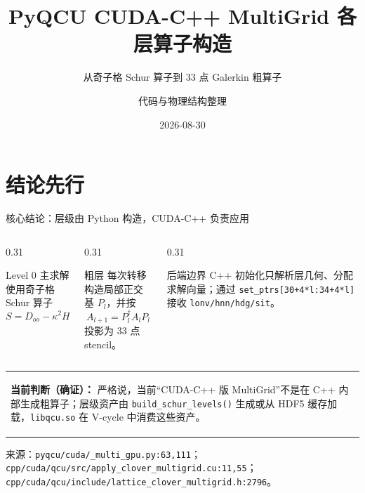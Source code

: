 \documentclass[UTF8,aspectratio=169,11pt]{ctexbeamer}
\title[PyQCU CUDA-C++ MG]{PyQCU CUDA-C++ MultiGrid 各层算子构造}
\subtitle{从奇子格 Schur 算子到 33 点 Galerkin 粗算子}
\author[代码与物理结构整理]{代码与物理结构整理}
\institute{PyQCU · Lattice QCD}
\date{2026-08-30}
\newcommand{\source}[1]{%
  \vspace{-0.08em}\par{\raggedright\scriptsize\color{muted}来源：#1\par}}
\newcommand{\src}[1]{\nolinkurl{#1}}
\newcommand{\verified}{\textcolor{evidence}{确证}}
\begin{document}
\begin{frame}[plain]
  \titlepage
\end{frame}

\section{结论先行}

\begin{frame}[t]{核心结论：层级由 Python 构造，CUDA-C++ 负责应用}
  \begin{columns}[T,totalwidth=\textwidth]
    \begin{column}{0.31\textwidth}
      \begin{block}{Level 0}
        \small
        主求解使用奇子格 Schur 算子
        \[
        S=D_{oo}-\kappa^2H_{oe}D_{ee}^{-1}H_{eo}.
        \]
      \end{block}
    \end{column}
    \begin{column}{0.31\textwidth}
      \begin{block}{粗层}
        \small
        每次转移构造局部正交基 $P_l$，并按
        \[
        A_{l+1}=P_l^\dagger A_lP_l
        \]
        投影为 33 点 stencil。
      \end{block}
    \end{column}
    \begin{column}{0.31\textwidth}
      \begin{block}{后端边界}
        \small
        C++ 初始化只解析层几何、分配求解向量；通过
        \src{set_ptrs[30+4*l:34+4*l]} 接收
        \src{lonv/hnn/hdg/sit}。
      \end{block}
    \end{column}
  \end{columns}
  \vspace{0.25em}
  \begin{tabular}{@{}p{}@{}}
    \colorbox{good}{\parbox{0.92\textwidth}{\textbf{当前判断（\verified）：}\quad
      严格说，当前“CUDA-C++ 版 MultiGrid”不是在 C++ 内部生成粗算子；层级资产由
      \src{build_schur_levels()} 生成或从 HDF5 缓存加载，\src{libqcu.so} 在 V-cycle 中消费这些资产。}}
  \end{tabular}
  \source{\src{pyqcu/cuda/_multi_gpu.py:63,111}；\src{cpp/cuda/qcu/src/apply_clover_multigrid.cu:11,55}；\src{cpp/cuda/qcu/include/lattice_clover_multigrid.h:2796}。}
\end{frame}
\end{document}
